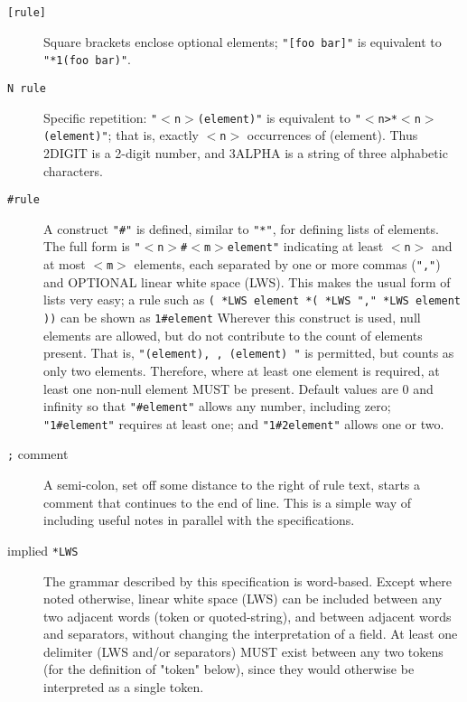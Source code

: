 \begin{description}
\item [\texttt{[rule]}] Square brackets enclose optional elements;
  \texttt{"[foo bar]"} is equivalent to \texttt{"*1(foo bar)"}.
  
\item [\texttt{N rule}] Specific repetition: \texttt{"$<$n$>$(element)"} is
  equivalent to \texttt{"$<$n>*$<$n$>$(element)"}; that is, exactly
  \texttt{$<$n$>$} occurrences of (element).  Thus 2DIGIT is a 2-digit
  number, and 3ALPHA is a string of three alphabetic characters.
  
\item [\texttt{\#rule}] A construct \texttt{"\#"} is defined, similar to
  \texttt{"*"}, for defining lists of elements. The full form is
  \texttt{"$<$n$>$\#$<$m$>$element"} indicating at least \texttt{$<$n$>$} and
  at most \texttt{$<$m$>$} elements, each separated by one or more commas
  (\texttt{","}) and OPTIONAL linear white space (LWS). This makes the usual
  form of lists very easy; a rule such as \texttt{( *LWS element *( *LWS ","
    *LWS element ))} can be shown as \texttt{1\#element} Wherever this
  construct is used, null elements are allowed, but do not contribute to the
  count of elements present. That is, \texttt{"(element), , (element) "} is
  permitted, but counts as only two elements. Therefore, where at least one
  element is required, at least one non-null element MUST be present. Default
  values are 0 and infinity so that \texttt{"\#element"} allows any number,
  including zero; \texttt{"1\#element"} requires at least one; and
  \texttt{"1\#2element"} allows one or two.
  
\item [\texttt{;} comment] A semi-colon, set off some distance to the right
  of rule text, starts a comment that continues to the end of line. This is a
  simple way of including useful notes in parallel with the specifications.
  
\item [implied \texttt{*LWS}] The grammar described by this specification is
  word-based. Except where noted otherwise, linear white space (LWS) can be
  included between any two adjacent words (token or quoted-string), and
  between adjacent words and separators, without changing the interpretation
  of a field. At least one delimiter (LWS and/or separators) MUST exist
  between any two tokens (for the definition of "token" below), since they
  would otherwise be interpreted as a single token.
\end{description}

